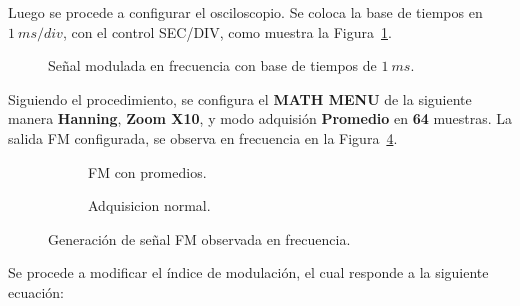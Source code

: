     Luego se procede a configurar el osciloscopio. Se coloca la base de tiempos  
    en $1~ms/div$, con el control SEC/DIV, como muestra la Figura~\ref{fig:Exp6SeñalFM1ms}.

      \begin{figure}[H]
        \centering
          \caption{Señal modulada en frecuencia con base de tiempos de $1~ms$.}
          \label{fig:Exp6SeñalFM1ms}
      \end{figure}

    Siguiendo el procedimiento, se configura el \textbf{MATH MENU} de la siguiente manera  
    \textbf{Hanning}, \textbf{Zoom X10}, y modo adquisión \textbf{Promedio} en 
    \textbf{64} muestras. La salida FM configurada, se observa en frecuencia en la Figura~\ref{fig:Exp6SeñalFMConfigurada}.

      \begin{figure}[H]
        \centering
        \begin{subfigure}[H]{0.48\textwidth}
          \caption{FM con promedios.}
          \label{fig:Exp6SeñalFM}
        \end{subfigure}
        \hfill 
        \begin{subfigure}[H]{0.48\textwidth}
          \caption{Adquisicion normal.}
          \label{fig:Exp6SeñalFMAdquisicionNormal}
        \end{subfigure}
        \caption{Generación de señal FM observada en frecuencia.}
        \label{fig:Exp6SeñalFMConfigurada}
      \end{figure}

    Se procede a modificar el índice de modulación, el cual responde a la 
    siguiente ecuación:

